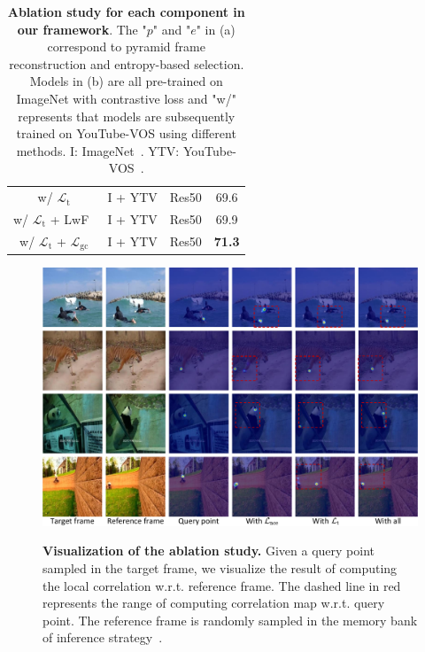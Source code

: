 \documentclass{article}
\begin{document}
\begin{table}[t]
{{\begin{tabular}{@{}cccc@{}}
            \hline
            w/ $\mathcal{L}_{\mathrm{t}}$    & I + YTV & Res50 &69.6          \\
            w/ $\mathcal{L}_{\mathrm{t}}$ + LwF~\cite{li2017learning}            & I + YTV & Res50 &69.9          \\
            w/ $\mathcal{L}_{\mathrm{t}}$ + $\mathcal{L}_{\mathrm{gc}}$ & I + YTV & Res50 &\textbf{71.3} \\
            \hline
            \end{tabular}%
            }
          }
    \captionsetup{font=small}
    \caption{\textbf{Ablation study for each component in our framework}.  The "$p$" and "$e$" in (a) correspond to pyramid frame reconstruction and entropy-based selection. Models in (b) are all pre-trained on ImageNet with contrastive loss and  "w/" represents that models are subsequently trained on YouTube-VOS using different methods. I: ImageNet~\cite{deng2009imagenet}.  YTV: YouTube-VOS~\cite{xu2018youtube}.}
    \label{tab:ablations}\vspace{-2mm}
\end{table}

\begin{figure}[!tb]
  \centering
  {\includegraphics[width=1.0\textwidth]{figure/abalations/ablataions.pdf}}
  \caption{\small \textbf{Visualization of the ablation study.} Given a query point sampled in the target frame, we visualize the result of computing the local correlation  w.r.t. reference frame. The dashed line in red represents the range of computing correlation map w.r.t. query point. The reference frame is randomly sampled in the memory bank of inference strategy~\cite{jabri2020space}\cite{lai2020mast}\cite{xu2021rethinking}. }
  \label{fig:ablations}
  \vspace{-7mm}
\end{figure}
\end{document}
